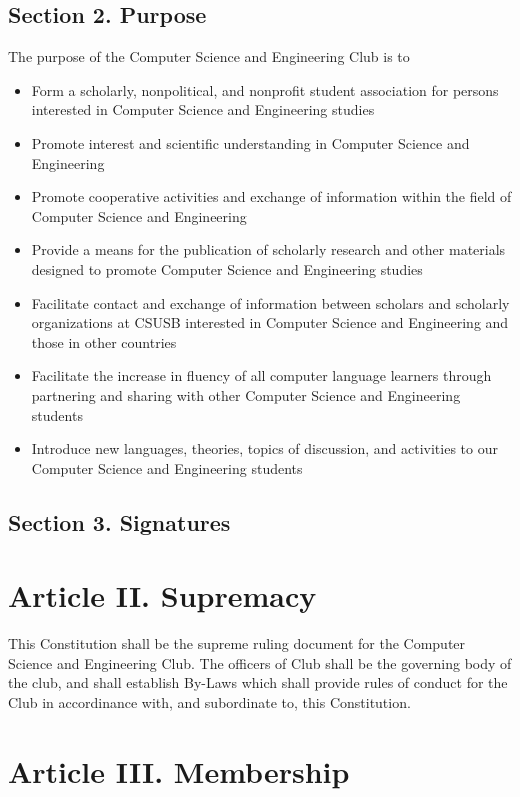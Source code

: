 \documentclass{article}
\begin{document}
  \subsection{Section 2. Purpose}
    The purpose of the Computer Science and Engineering Club is to
    \begin{itemize}
      \item Form a scholarly, nonpolitical, and nonprofit student association for persons interested in Computer Science and Engineering studies
      \item Promote interest and scientific understanding in Computer Science and Engineering
      \item Promote cooperative activities and exchange of information within the field of Computer Science and Engineering
      \item Provide a means for the publication of scholarly research and other materials designed to promote Computer Science and Engineering studies
      \item Facilitate contact and exchange of information between scholars and scholarly organizations at CSUSB interested in Computer Science and Engineering and those in other countries
      \item Facilitate the increase in fluency of all computer language learners through partnering and sharing with other Computer Science and Engineering students
      \item Introduce new languages, theories, topics of discussion, and activities to our Computer Science and Engineering students
    \end{itemize}

  \subsection{Section 3. Signatures}
  \newpage

\section{Article II. Supremacy}
  This Constitution shall be the supreme ruling document for the Computer Science and Engineering Club. The officers of Club shall be the governing body of the club, and shall establish By-Laws which shall provide rules of conduct for the Club in accordinance with, and subordinate to, this Constitution.

\section{Article III. Membership}
\end{document}
